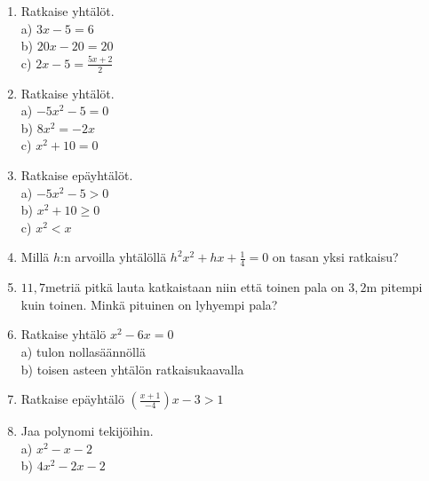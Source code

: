 \begin{enumerate}
\item Ratkaise yhtälöt.\\ a) $3x-5=6$\\ b) $20x-20=20$\\ c) $2x-5=\frac{5x+2}{2}$
\item Ratkaise yhtälöt.\\ a) $-5x^2-5=0$\\ b) $8x^2=-2x$\\ c) $x^2+10=0$
\item Ratkaise epäyhtälöt.\\ a) $-5x^2-5>0$\\ b) $x^2+10\geq0$\\ c) $x^2<x$
\item Millä $h$:n arvoilla yhtälöllä $h^2x^2+hx+\frac{1}{4}=0$ on tasan yksi ratkaisu?
\item $11,7$metriä pitkä lauta katkaistaan niin että toinen pala on $3,2$m pitempi kuin toinen. Minkä pituinen on lyhyempi pala?
\item Ratkaise yhtälö $x^2-6x=0$\\ a) tulon nollasäännöllä\\ b) toisen asteen yhtälön ratkaisukaavalla
\item Ratkaise epäyhtälö $(\frac{x+1}{-4})x-3>1$
\item Jaa polynomi tekijöihin.\\ a) $x^2-x-2$\\ b) $4x^2-2x-2$


\end{enumerate}

